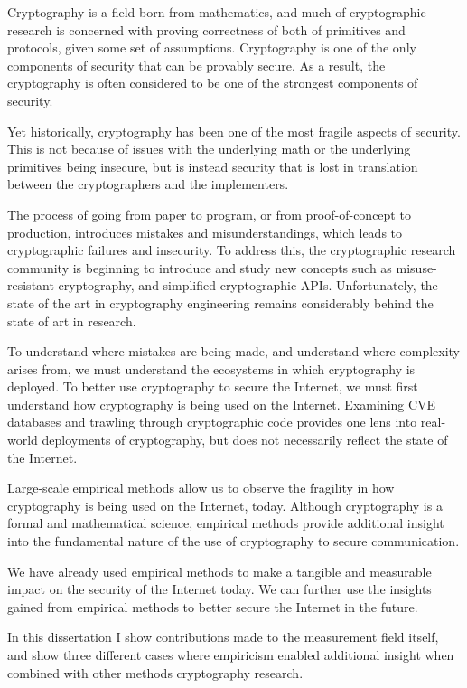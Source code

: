 
Cryptography is a field born from mathematics, and much of cryptographic
research is concerned with proving correctness of both of primitives and
protocols, given some set of assumptions. Cryptography is one of the only
components of security that can be provably secure. As a result, the
cryptography is often considered to be one of the strongest components of
security.

Yet historically, cryptography has been one of the most fragile aspects of
security. This is not because of issues with the underlying math or the
underlying primitives being insecure, but is instead security that is lost in
translation between the cryptographers and the implementers.

The process of going from paper to program, or from proof-of-concept to
production, introduces mistakes and misunderstandings, which leads to
cryptographic failures and insecurity. To address this, the cryptographic
research community is beginning to introduce and study new concepts such as
misuse-resistant cryptography, and simplified cryptographic APIs.
Unfortunately, the state of the art in cryptography engineering remains
considerably behind the state of art in research.

To understand where mistakes are being made, and understand where complexity
arises from, we must understand the ecosystems in which cryptography is
deployed. To better use cryptography to secure the Internet, we must first
understand how cryptography is being used on the Internet. Examining CVE databases
and trawling through cryptographic code provides one lens into real-world
deployments of cryptography, but does not necessarily reflect the state of
the Internet.

Large-scale empirical methods allow us to observe the fragility in how
cryptography is being used on the Internet, today. Although cryptography is a
formal and mathematical science, empirical methods provide additional insight
into the fundamental nature of the use of cryptography to secure
communication.

We have already used empirical methods to make a tangible and
measurable impact on the security of the Internet today. We can further use
the insights gained from empirical methods to better secure the Internet in
the future.

In this dissertation I show contributions made to the measurement field itself,
and show three different cases where empiricism enabled additional insight when
combined with other methods cryptography research.

